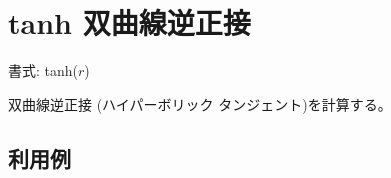 
%

\section{tanh 双曲線逆正接\label{sect:tanh}}

書式: tanh($r$)

双曲線逆正接 (ハイパーボリック タンジェント)を計算する。

\subsection*{利用例}


%


